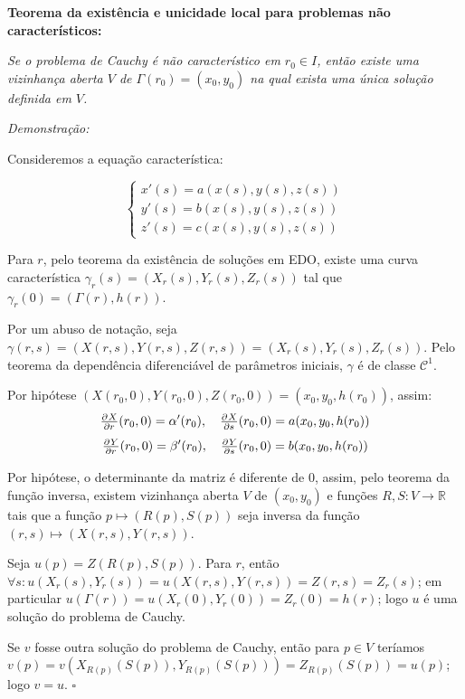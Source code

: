 \documentclass[11pt,twoside,a4paper]{book}
\begin{document}
\bigskip
\noindent
\textbf{Teorema da existência e unicidade local para problemas não característicos:}

\noindent
\textit{Se o problema de Cauchy é não característico em $r_0\in I$, então existe uma vizinhança aberta $V$ de $\Gamma(r_0)=(x_0,y_0)$ na qual exista uma única solução definida em $V$.}

\smallskip
\noindent
\textit{Demonstração:}

\noindent
Consideremos a equação característica:

\begin{equation*}
    \begin{cases}
    x'(s)=a(x(s),y(s),z(s)) \\
    y'(s)=b(x(s),y(s),z(s)) \\
    z'(s)=c(x(s),y(s),z(s))
    \end{cases}
\end{equation*}

\smallskip
\noindent
Para $r$, pelo teorema da existência de soluções em EDO, existe uma curva característica $\gamma_r(s)=(X_r(s),Y_r(s),Z_r(s))$ tal que $\gamma_r(0)=(\Gamma(r),h(r))$.

\smallskip
\noindent
Por um abuso de notação, seja $\gamma(r,s)=(X(r,s),Y(r,s),Z(r,s))=(X_r(s),Y_r(s),Z_r(s))$. Pelo teorema da dependência diferenciável de parâmetros iniciais, $\gamma$ é de classe $\mathcal{C}^1$.


\smallskip
\noindent
Por hipótese $\left(X\left(r_0,0\right),Y\left(r_0,0\right),Z\left(r_0,0\right)\right)=(x_0,y_0,h(r_0))$, assim:
\[
\pd{X}{r}(r_0,0)=\alpha'(r_0),\quad \pd{X}{s}(r_0,0)=a(x_0,y_0,h(r_0))
\]
\[
\pd{Y}{r}(r_0,0)=\beta'(r_0),\quad \pd{Y}{s}(r_0,0)=b(x_0,y_0,h(r_0))
\]

\noindent
Por hipótese, o determinante da matriz é diferente de $0$, assim, pelo teorema da função inversa, existem vizinhança aberta $V$ de $(x_0,y_0)$ e funções $R,S:V\rightarrow\mathbb{R}$ tais que a função $p\mapsto(R(p),S(p))$ seja inversa da função $(r,s)\mapsto(X(r,s),Y(r,s))$.

\smallskip
\noindent
Seja $u(p)=Z(R(p),S(p))$. Para $r$, então $\forall s:u(X_r(s),Y_r(s))=u(X(r,s),Y(r,s))=Z(r,s)=Z_r(s)$; em particular $u(\Gamma(r))=u(X_r(0),Y_r(0))=Z_r(0)=h(r)$; logo $u$ é uma solução do problema de Cauchy.

\smallskip
\noindent
Se $v$ fosse outra solução do problema de Cauchy, então para $p\in V$ teríamos $v(p)=v(X_{R(p)}(S(p)),Y_{R(p)}(S(p)))=Z_{R(p)}(S(p))=u(p)$; logo $v=u$. $\square$
\end{document}
